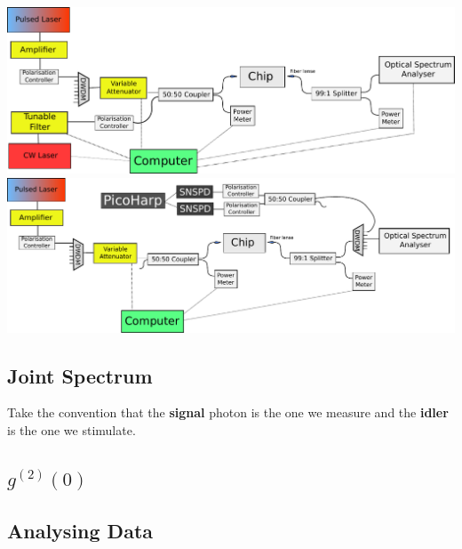 \begingroup
    \centering  
    \includegraphics[width=18cm]{img/method/setup_2.pdf}
     \vspace{3pt} \label{bigJSIExp}
\endgroup
\begingroup
    \centering  
    \includegraphics[width=18cm]{img/method/setup_3.pdf}
     \vspace{3pt} \label{crossCompare}
\endgroup




\subsection{Joint Spectrum}
Take the convention that the {\bf signal} photon is the one we measure and the {\bf idler} is the one we stimulate.
\subsection{$g^{(2)}(0)$}
\subsection{Analysing Data}

